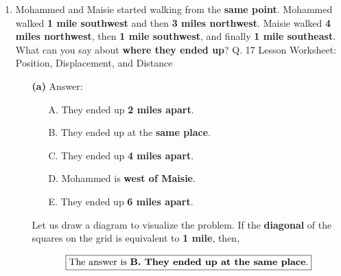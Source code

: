 \documentclass[A4,12pt]{article}
\begin{document}
\begin{enumerate}[label=\bfseries (\arabic*)]
\item Mohammed and Maisie started walking from the \textbf{same point}. Mohammed walked \textbf{1 mile southwest} and then \textbf{3 miles northwest}. Maisie walked \textbf{4 miles northwest}, then \textbf{1 mile southwest}, and finally \textbf{1 mile southeast}. What can you say about \textbf{where they ended up}? \cite{Nagwa} Q. 17 Lesson Worksheet: Position, Displacement, and Distance
%
\begin{itemize}
\item[\bf (a)] Answer:
\begin{itemize}
    \item[A.] They ended up \textbf{2 miles apart}.
    \item[B.] They ended up at the \textbf{same place}.
    \item[C.] They ended up \textbf{4 miles apart}.
    \item[D.] Mohammed is \textbf{west of Maisie}.
    \item[E.] They ended up \textbf{6 miles apart}.
\end{itemize}
%
\begin{example}
Let us draw a diagram to visualize the problem. If the \textbf{diagonal} of the squares on the grid is equivalent to \textbf{1 mile}, then,
%
\begin{figure}[H]
    \centering
\end{figure}
\begin{equation*}
    \boxed{\text{The answer is \textbf{B. They ended up at the same place}.}}
\end{equation*}

\end{example}
\end{itemize}
\end{enumerate}
\end{document}
